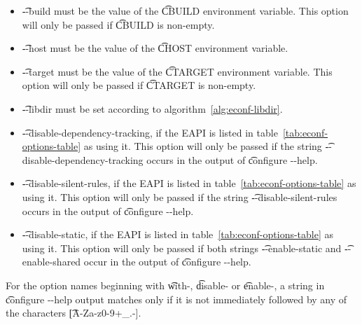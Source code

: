 \begin{description}
\begin{itemize}
    \item \t{-{}-build} must be the value of the \t{CBUILD} environment variable. This option will
        only be passed if \t{CBUILD} is non-empty.
    \item \t{-{}-host} must be the value of the \t{CHOST} environment variable.
    \item \t{-{}-target} must be the value of the \t{CTARGET} environment variable. This option will
        only be passed if \t{CTARGET} is non-empty.
    \item \t{-{}-libdir} must be set according to algorithm~\ref{alg:econf-libdir}.
    \item \t{-{}-disable-dependency-tracking}, if the EAPI is listed in
        table~\ref{tab:econf-options-table} as using it. This option will only be passed if the
        string \t{-{}-disable-dependency-tracking} occurs in the output of \t{configure -{}-help}.
    \item \t{-{}-disable-silent-rules}, if the EAPI is listed in table~\ref{tab:econf-options-table}
        as using it. This option will only be passed if the string \t{-{}-disable-silent-rules}
        occurs in the output of \t{configure -{}-help}.
    \item \t{-{}-disable-static}, if the EAPI is listed in table~\ref{tab:econf-options-table}
        as using it. This option will only be passed if both strings \t{-{}-enable-static} and
        \t{-{}-enable-shared} occur in the output of \t{configure -{}-help}.
    \end{itemize}

    For the option names beginning with \t{with-}, \t{disable-} or \t{enable-}, a string in
    \t{configure -{}-help} output matches only if it is not immediately followed by any of the
    characters \t{[A-Za-z0-9+_.-]}.


\end{description}
